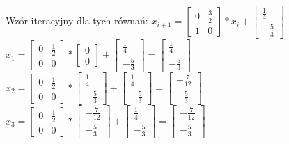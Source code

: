 \documentclass{article}
\begin{document}
Wzór iteracyjny dla tych równań: $x_{i+1}=\begin{bmatrix} 0 & \frac{3}{2} \\ 1 & 0 \end{bmatrix}*x_i+\begin{bmatrix} \frac{1}{4} \\ -\frac{5}{3} \end{bmatrix}$\\
$x_1=\begin{bmatrix} 0 & \frac{1}{2} \\ 0 & 0 \end{bmatrix}*\begin{bmatrix} 0 \\ 0 \end{bmatrix}+\begin{bmatrix} \frac{1}{4} \\ -\frac{5}{3} \end{bmatrix} = \begin{bmatrix} \frac{1}{4} \\ -\frac{5}{3} \end{bmatrix}$\\
$x_2=\begin{bmatrix} 0 & \frac{1}{2} \\ 0 & 0 \end{bmatrix}*\begin{bmatrix} \frac{1}{4} \\ -\frac{5}{3} \end{bmatrix}+\begin{bmatrix} \frac{1}{4} \\ -\frac{5}{3} \end{bmatrix} = \begin{bmatrix} -\frac{7}{12} \\ -\frac{5}{3} \end{bmatrix}$\\
$x_3=\begin{bmatrix} 0 & \frac{1}{2} \\ 0 & 0 \end{bmatrix}*\begin{bmatrix} -\frac{7}{12} \\ -\frac{5}{3} \end{bmatrix}+\begin{bmatrix} \frac{1}{4} \\ -\frac{5}{3} \end{bmatrix} = \begin{bmatrix} -\frac{7}{12} \\ -\frac{5}{3} \end{bmatrix}$\\
\end{document}
